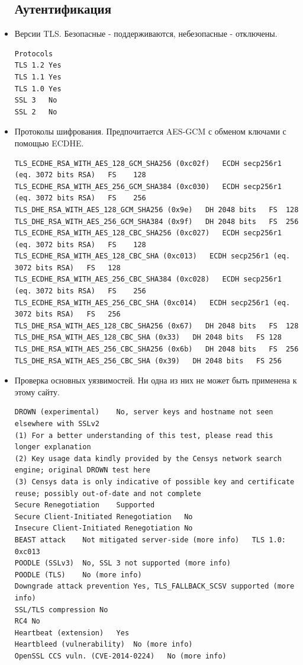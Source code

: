 \begin{itemize}
\subsection{Аутентификация}
	
	\item Версии TLS. Безопасные - поддерживаются, небезопасные - отключены.
	\begin{lstlisting}
Protocols
TLS 1.2	Yes
TLS 1.1	Yes
TLS 1.0	Yes
SSL 3	No
SSL 2	No
	\end{lstlisting}
	
	\item Протоколы шифрования. Предпочитается AES-GCM с обменом ключами с помощью ECDHE.
	\begin{lstlisting}
TLS_ECDHE_RSA_WITH_AES_128_GCM_SHA256 (0xc02f)   ECDH secp256r1 (eq. 3072 bits RSA)   FS	128
TLS_ECDHE_RSA_WITH_AES_256_GCM_SHA384 (0xc030)   ECDH secp256r1 (eq. 3072 bits RSA)   FS	256
TLS_DHE_RSA_WITH_AES_128_GCM_SHA256 (0x9e)   DH 2048 bits   FS	128
TLS_DHE_RSA_WITH_AES_256_GCM_SHA384 (0x9f)   DH 2048 bits   FS	256
TLS_ECDHE_RSA_WITH_AES_128_CBC_SHA256 (0xc027)   ECDH secp256r1 (eq. 3072 bits RSA)   FS	128
TLS_ECDHE_RSA_WITH_AES_128_CBC_SHA (0xc013)   ECDH secp256r1 (eq. 3072 bits RSA)   FS	128
TLS_ECDHE_RSA_WITH_AES_256_CBC_SHA384 (0xc028)   ECDH secp256r1 (eq. 3072 bits RSA)   FS	256
TLS_ECDHE_RSA_WITH_AES_256_CBC_SHA (0xc014)   ECDH secp256r1 (eq. 3072 bits RSA)   FS	256
TLS_DHE_RSA_WITH_AES_128_CBC_SHA256 (0x67)   DH 2048 bits   FS	128
TLS_DHE_RSA_WITH_AES_128_CBC_SHA (0x33)   DH 2048 bits   FS	128
TLS_DHE_RSA_WITH_AES_256_CBC_SHA256 (0x6b)   DH 2048 bits   FS	256
TLS_DHE_RSA_WITH_AES_256_CBC_SHA (0x39)   DH 2048 bits   FS	256
	\end{lstlisting}
	
	\item Проверка основных уязвимостей. Ни одна из них не может быть применена к этому сайту.
	\begin{lstlisting}
DROWN (experimental)	No, server keys and hostname not seen elsewhere with SSLv2
(1) For a better understanding of this test, please read this longer explanation
(2) Key usage data kindly provided by the Censys network search engine; original DROWN test here
(3) Censys data is only indicative of possible key and certificate reuse; possibly out-of-date and not complete
Secure Renegotiation	Supported
Secure Client-Initiated Renegotiation	No
Insecure Client-Initiated Renegotiation	No
BEAST attack	Not mitigated server-side (more info)   TLS 1.0: 0xc013
POODLE (SSLv3)	No, SSL 3 not supported (more info)
POODLE (TLS)	No (more info)
Downgrade attack prevention	Yes, TLS_FALLBACK_SCSV supported (more info)
SSL/TLS compression	No
RC4	No
Heartbeat (extension)	Yes
Heartbleed (vulnerability)	No (more info)
OpenSSL CCS vuln. (CVE-2014-0224)	No (more info)
	\end{lstlisting}
	

\end{itemize}
